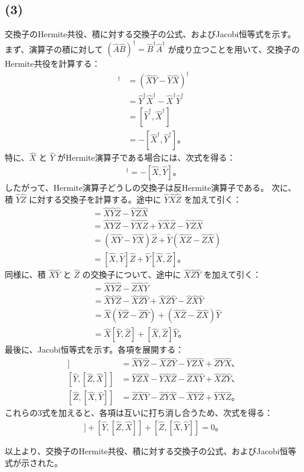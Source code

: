 \documentclass[platex,dvipdfmx,a4paper]{jsarticle}
\begin{document}
\subsection*{(3)}
交換子のHermite共役、積に対する交換子の公式、およびJacobi恒等式を示す。
まず、演算子の積に対して $(\hat{A}\hat{B})^\dagger=\hat{B}^\dagger\hat{A}^\dagger$ が成り立つことを用いて、交換子のHermite共役を計算する：
\begin{align*}
  [\hat{X},\hat{Y}]^\dagger
  &= \left(\hat{X}\hat{Y}-\hat{Y}\hat{X}\right)^\dagger \\
  &= \hat{Y}^\dagger\hat{X}^\dagger-\hat{X}^\dagger\hat{Y}^\dagger \\
  &= [\hat{Y}^\dagger,\hat{X}^\dagger] \\
  &= -[\hat{X}^\dagger,\hat{Y}^\dagger]。
\end{align*}
特に、$\hat{X}$ と $\hat{Y}$ がHermite演算子である場合には、次式を得る：
\begin{align*}
  [\hat{X},\hat{Y}]^\dagger=-[\hat{X},\hat{Y}]。
\end{align*}
したがって、Hermite演算子どうしの交換子は反Hermite演算子である。
次に、積 $\hat{Y}\hat{Z}$ に対する交換子を計算する。途中に $\hat{Y}\hat{X}\hat{Z}$ を加えて引く：
\begin{align*}
  [\hat{X},\hat{Y}\hat{Z}]
  &= \hat{X}\hat{Y}\hat{Z}-\hat{Y}\hat{Z}\hat{X} \\
  &= \hat{X}\hat{Y}\hat{Z}-\hat{Y}\hat{X}\hat{Z}+\hat{Y}\hat{X}\hat{Z}-\hat{Y}\hat{Z}\hat{X} \\
  &= \left(\hat{X}\hat{Y}-\hat{Y}\hat{X}\right)\hat{Z}+\hat{Y}\left(\hat{X}\hat{Z}-\hat{Z}\hat{X}\right) \\
  &= [\hat{X},\hat{Y}]\hat{Z}+\hat{Y}[\hat{X},\hat{Z}]。
\end{align*}
同様に、積 $\hat{X}\hat{Y}$ と $\hat{Z}$ の交換子について、途中に $\hat{X}\hat{Z}\hat{Y}$ を加えて引く：
\begin{align*}
  [\hat{X}\hat{Y},\hat{Z}]
  &= \hat{X}\hat{Y}\hat{Z}-\hat{Z}\hat{X}\hat{Y} \\
  &= \hat{X}\hat{Y}\hat{Z}-\hat{X}\hat{Z}\hat{Y}+\hat{X}\hat{Z}\hat{Y}-\hat{Z}\hat{X}\hat{Y} \\
  &= \hat{X}\left(\hat{Y}\hat{Z}-\hat{Z}\hat{Y}\right)+\left(\hat{X}\hat{Z}-\hat{Z}\hat{X}\right)\hat{Y} \\
  &= \hat{X}[\hat{Y},\hat{Z}]+[\hat{X},\hat{Z}]\hat{Y}。
\end{align*}
最後に、Jacobi恒等式を示す。各項を展開する：
\begin{align*}
  [\hat{X},[\hat{Y},\hat{Z}]]
  &= \hat{X}\hat{Y}\hat{Z}-\hat{X}\hat{Z}\hat{Y}-\hat{Y}\hat{Z}\hat{X}+\hat{Z}\hat{Y}\hat{X}、\\
  [\hat{Y},[\hat{Z},\hat{X}]]
  &= \hat{Y}\hat{Z}\hat{X}-\hat{Y}\hat{X}\hat{Z}-\hat{Z}\hat{X}\hat{Y}+\hat{X}\hat{Z}\hat{Y}、\\
  [\hat{Z},[\hat{X},\hat{Y}]]
  &= \hat{Z}\hat{X}\hat{Y}-\hat{Z}\hat{Y}\hat{X}-\hat{X}\hat{Y}\hat{Z}+\hat{Y}\hat{X}\hat{Z}。
\end{align*}
これらの3式を加えると、各項は互いに打ち消し合うため、次式を得る：
\begin{align*}
  [\hat{X},[\hat{Y},\hat{Z}]]
  +[\hat{Y},[\hat{Z},\hat{X}]]
  +[\hat{Z},[\hat{X},\hat{Y}]]
  =0。
\end{align*}

以上より、交換子のHermite共役、積に対する交換子の公式、およびJacobi恒等式が示された。\\
\end{document}
